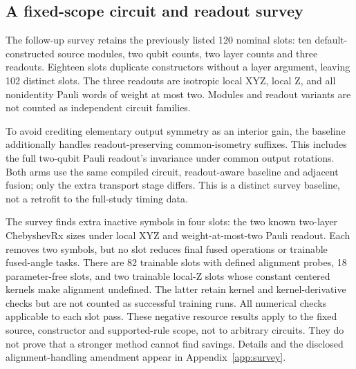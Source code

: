 \subsection{A fixed-scope circuit and readout survey}
The follow-up survey retains the previously listed 120 nominal slots:
ten default-constructed source modules, two qubit counts, two layer
counts and three readouts. Eighteen slots duplicate constructors
without a layer argument, leaving 102 distinct slots. The three
readouts are isotropic local XYZ, local Z, and all nonidentity Pauli
words of weight at most two. Modules and readout variants are not
counted as independent circuit families.

To avoid crediting elementary output symmetry as an interior gain,
the baseline additionally handles readout-preserving common-isometry
suffixes. This includes the full two-qubit Pauli readout's invariance
under common output rotations. Both arms use the same compiled circuit,
readout-aware baseline and adjacent fusion; only the extra transport
stage differs. This is a distinct survey baseline, not a retrofit to
the full-study timing data.

The survey finds extra inactive symbols in four slots: the two known
two-layer ChebyshevRx sizes under local XYZ and weight-at-most-two
Pauli readout. Each removes two symbols, but no slot reduces final
fused operations or trainable fused-angle tasks. There are 82 trainable
slots with defined alignment probes, 18 parameter-free slots, and two
trainable local-Z slots whose constant centered kernels make alignment
undefined. The latter retain kernel and kernel-derivative checks but
are not counted as successful training runs. All numerical checks
applicable to each slot pass. These negative resource results apply to
the fixed source, constructor and supported-rule scope, not to arbitrary
circuits. They do not prove that a stronger method cannot find savings.
Details and the disclosed alignment-handling amendment appear in
Appendix~\ref{app:survey}.
